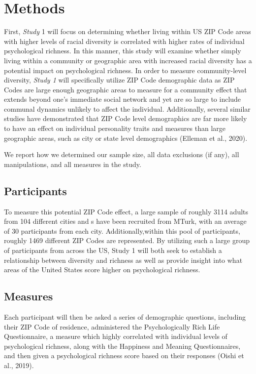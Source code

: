 \documentclass[
  man,floatsintext]{apa7}
\begin{document}
\hypertarget{methods}{%
\section{Methods}\label{methods}}

First, \emph{Study} 1 will focus on determining whether living within US ZIP Code areas with higher levels of racial diversity is correlated with higher rates of individual psychological richness. In this manner, this study will examine whether simply living within a community or geographic area with increased racial diversity has a potential impact on psychological richness. In order to measure community-level diversity, \emph{Study 1} will specifically utilize ZIP Code demographic data as ZIP Codes are large enough geographic areas to measure for a community effect that extends beyond one's immediate social network and yet are so large to include communal dynamics unlikely to affect the individual. Additionally, several similar studies have demonstrated that ZIP Code level demographics are far more likely to have an effect on individual personality traits and measures than large geographic areas, such as city or state level demographics (Elleman et al., 2020).

We report how we determined our sample size, all data exclusions (if any), all manipulations, and all measures in the study.

\hypertarget{participants}{%
\subsection{Participants}\label{participants}}

To measure this potential ZIP Code effect, a large sample of roughly 3114 adults from 104 different cities and s have been recruited from MTurk, with an average of 30 participants from each city. Additionally,within this pool of participants, roughly 1469 different ZIP Codes are represented. By utilizing such a large group of participants from across the US, Study 1 will both seek to establish a relationship between diversity and richness as well as provide insight into what areas of the United States score higher on psychological richness.

\hypertarget{measures}{%
\subsection{Measures}\label{measures}}

Each participant will then be asked a series of demographic questions, including their ZIP Code of residence, administered the Psychologically Rich Life Questionnaire, a measure which highly correlated with individual levels of psychological richness, along with the Happiness and Meaning Questionnaires, and then given a psychological richness score based on their responses (Oishi et al., 2019).
\end{document}
